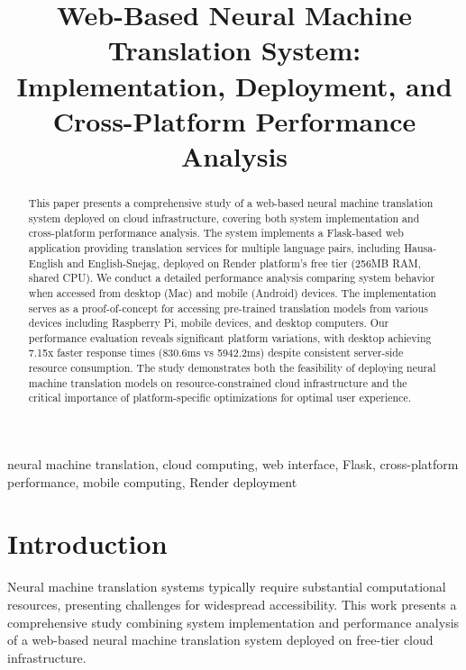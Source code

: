 \documentclass[conference]{IEEEtran}
\begin{document}
\title{Web-Based Neural Machine Translation System: Implementation, Deployment, and Cross-Platform Performance Analysis}

\author{
}

\maketitle

\begin{abstract}
This paper presents a comprehensive study of a web-based neural machine translation system deployed on cloud infrastructure, covering both system implementation and cross-platform performance analysis. The system implements a Flask-based web application providing translation services for multiple language pairs, including Hausa-English and English-Snejag, deployed on Render platform's free tier (256MB RAM, shared CPU). We conduct a detailed performance analysis comparing system behavior when accessed from desktop (Mac) and mobile (Android) devices. The implementation serves as a proof-of-concept for accessing pre-trained translation models from various devices including Raspberry Pi, mobile devices, and desktop computers. Our performance evaluation reveals significant platform variations, with desktop achieving 7.15x faster response times (830.6ms vs 5942.2ms) despite consistent server-side resource consumption. The study demonstrates both the feasibility of deploying neural machine translation models on resource-constrained cloud infrastructure and the critical importance of platform-specific optimizations for optimal user experience.
\end{abstract}

\begin{IEEEkeywords}
neural machine translation, cloud computing, web interface, Flask, cross-platform performance, mobile computing, Render deployment
\end{IEEEkeywords}

\section{Introduction}

Neural machine translation systems typically require substantial computational resources, presenting challenges for widespread accessibility. This work presents a comprehensive study combining system implementation and performance analysis of a web-based neural machine translation system deployed on free-tier cloud infrastructure.
\end{document}
